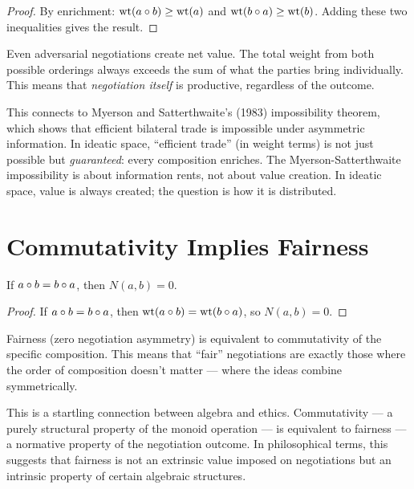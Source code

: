 \begin{proof}
By enrichment: $\operatorname{wt}(a \circ b) \geq \operatorname{wt}(a)$ and $\operatorname{wt}(b \circ a) \geq \operatorname{wt}(b)$. Adding these two inequalities gives the result.
\end{proof}

\begin{interpretation}
Even adversarial negotiations create net value. The total weight from both possible orderings always exceeds the sum of what the parties bring individually. This means that \emph{negotiation itself} is productive, regardless of the outcome.

This connects to Myerson and Satterthwaite's (1983) impossibility theorem, which shows that efficient bilateral trade is impossible under asymmetric information. In ideatic space, ``efficient trade'' (in weight terms) is not just possible but \emph{guaranteed}: every composition enriches. The Myerson-Satterthwaite impossibility is about information rents, not about value creation. In ideatic space, value is always created; the question is how it is distributed.
\end{interpretation}

\section{Commutativity Implies Fairness}

\begin{theorem}
\label{thm:comm-fair}
If $a \circ b = b \circ a$, then $N(a,b) = 0$.
\end{theorem}

\begin{proof}
If $a \circ b = b \circ a$, then $\operatorname{wt}(a \circ b) = \operatorname{wt}(b \circ a)$, so $N(a,b) = 0$.
\end{proof}

\begin{corollary}
Fairness (zero negotiation asymmetry) is equivalent to commutativity of the specific composition. This means that ``fair'' negotiations are exactly those where the order of composition doesn't matter --- where the ideas combine symmetrically.
\end{corollary}

\begin{remark}
This is a startling connection between algebra and ethics. Commutativity --- a purely structural property of the monoid operation --- is equivalent to fairness --- a normative property of the negotiation outcome. In philosophical terms, this suggests that fairness is not an extrinsic value imposed on negotiations but an intrinsic property of certain algebraic structures.
\end{remark}


